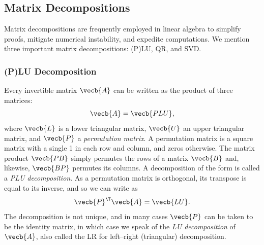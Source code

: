 \subsection{Matrix Decompositions}
Matrix decompositions are frequently employed in linear algebra to simplify proofs, mitigate numerical instability, and expedite computations. We mention three important matrix decompositions: (P)LU, QR, and SVD.

\subsubsection{(P)LU Decomposition}
Every invertible matrix $\vecb{A}$ can be written as the product of three matrices:
\begin{equation}
	\vecb{A} = \vecb{PLU}, \label{eq:PLUDecomposition}
\end{equation}
where $\vecb{L}$ is a lower triangular matrix, $\vecb{U}$ an upper triangular matrix, and $\vecb{P}$ a \textit{permutation matrix}. A permutation matrix is a square matrix with a single 1 in each row and column, and zeros otherwise. The matrix product $\vecb{PB}$ simply permutes the rows of a matrix $\vecb{B}$ and, likewise, $\vecb{BP}$ permutes its columns. A decomposition of the form  is called a \textit{PLU decomposition}. As a permutation matrix is orthogonal, its transpose is equal to its inverse, and so we can write  as
\begin{equation*}
	\vecb{P}^\T \vecb{A} = \vecb{LU}.
\end{equation*}
The decomposition is not unique, and in many cases $\vecb{P}$ can be taken to be the identity matrix, in which case we speak of the \textit{LU decomposition} of $\vecb{A}$, also called the LR for left--right (triangular) decomposition.

